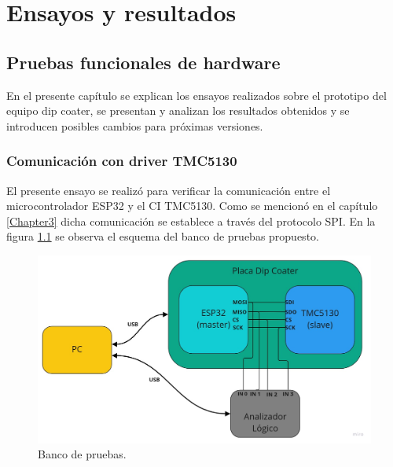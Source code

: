 
\chapter{Ensayos y resultados} %

\label{Chapter4} %


\section{Pruebas funcionales de hardware}

En el presente capítulo se explican los ensayos realizados sobre el prototipo del equipo dip coater, se presentan y analizan los resultados obtenidos y se introducen posibles cambios para próximas versiones.
\subsection{Comunicación con driver TMC5130}

El presente ensayo se realizó para verificar la comunicación entre el microcontrolador ESP32 y el CI TMC5130. Como se mencionó en el capítulo \ref{Chapter3} dicha comunicación se establece a través del  protocolo SPI. En la figura \ref{fig:ensayo_spi_0} se observa el esquema del banco de pruebas propuesto.

\begin{figure}[h!]
\centering 
\includegraphics[width=1\textwidth]{./Figures/ensayo_spi.jpg}
\caption{Banco de pruebas.}
\label{fig:ensayo_spi_0}
\end{figure}


